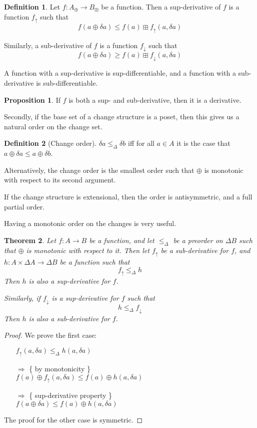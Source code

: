 \documentclass[english]{article}
\theoremstyle{plain}
\newtheorem{thm}{Theorem}
\theoremstyle{definition}
\newtheorem{prop}[thm]{Proposition}
\theoremstyle{remark}
\theoremstyle{remark}
\theoremstyle{remark}
\theoremstyle{definition}
\newtheorem{defn}{Definition}
\newcommand{\cplus}{\oplus}
\newcommand{\cpluss}{\boxplus}
\newcommand{\changes}[1]{\Delta #1}
\newcommand{\change}[1]{\delta #1}
\newcommand{\supderive}[1]{#1_\uparrow}
\newcommand{\subderive}[1]{#1_\downarrow}
\newcommand{\changeOrder}{\leq_\Delta}
\begin{document}
\begin{defn}
  Let $f: A_\cplus \rightarrow B_\cpluss$ be a function. Then a sup-derivative
  of $f$ is a function $\supderive{f}$ such that
  $$f(a \cplus \change{a}) \leq f(a) \cpluss \supderive{f}(a, \change{a})$$
  
  Similarly, a sub-derivative of $f$ is a function $\subderive{f}$ such that 
  $$f(a \cplus \change{a}) \geq f(a) \cpluss \subderive{f}(a, \change{a})$$

  A function with a sup-derivative is sup-differentiable, and a function with a
  sub-derivative is sub-differentiable.
\end{defn}

\begin{prop}
  If $f$ is both a sup- and sub-derivative, then it is a derivative.
\end{prop}

Secondly, if the base set of a change structure is a poset, then this gives us a natural
order on the change set.

\begin{defn}[Change order]
  $\change{a} \changeOrder \change{b}$ iff for all $a \in A$ it is the case that
  $a \cplus \change{a} \leq a \cplus \change{b}$.
\end{defn}

Alternatively, the change order is the smallest order such that $\cplus$ is monotonic with
respect to its second argument.

If the change structure is extensional, then the order is antisymmetric, and a
full partial order.

Having a monotonic order on the changes is very useful.

\begin{thm}
  Let $f: A \rightarrow B$ be a function, and let $\changeOrder$ be a preorder on $\changes{B}$ such that $\cplus$ is monotonic with
  respect to it. Then let $\supderive{f}$ be a sub-derivative for $f$, and $h: A \times
  \changes{A} \rightarrow \changes{B}$ be a function such that
  $$\supderive{f} \changeOrder h$$
  Then $h$ is also a sup-derivative for $f$.

  Similarly, if $\subderive{f}$ is a sup-derivative for $f$ such that 
  $$h \changeOrder \subderive{f}$$
  Then $h$ is also a sub-derivative for $f$.
\end{thm}
\begin{proof}
  We prove the first case:
  \begin{itemize}
    \item[ ]$\supderive{f}(a, \change{a}) \changeOrder h(a, \change{a})$
    \item[$\Rightarrow$]\{ by monotonicity \}\\
      $f(a) \cplus \supderive{f}(a, \change{a}) \leq f(a) \cplus h(a, \change{a})$
    \item[$\Rightarrow$]\{ sup-derivative property \}\\
      $f(a \cplus \change{a}) \leq f(a) \cplus h(a, \change{a})$
  \end{itemize}

  The proof for the other case is symmetric.
\end{proof}
\end{document}
